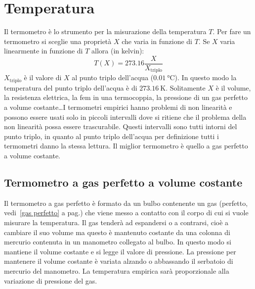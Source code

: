 \section{Temperatura}
Il termometro è lo strumento per la misurazione della temperatura $T$. Per fare un termometro si sceglie una proprietà $X$ che varia in funzione di $T$. Se $X$ varia linearmente in funzione di $T$ allora (in kelvin):
\begin{equation}
   T(X)=273.16\frac{X}{X_\text{triplo}}
\end{equation}
$X_\text{triplo}$ è il valore di $X$ al punto triplo dell'acqua ($\SI{0.01}{\celsius}$). In questo modo la temperatura del punto triplo dell'acqua è di $\SI{273.16}{\kelvin}$. Solitamente $X$ è il volume, la resistenza elettrica, la fem in una termocoppia, la pressione di un gas perfetto a volume costante\ldots I termometri empirici hanno problemi di non linearità e possono essere usati solo in piccoli intervalli dove si ritiene che il problema della non linearità possa essere trascurabile. Questi intervalli sono tutti intorni del punto triplo, in quanto al punto triplo dell'acqua per definizione tutti i termometri danno la stessa lettura. Il miglior termometro è quello a gas perfetto a volume costante.

\subsection{Termometro a gas perfetto a volume costante}
Il termometro a gas perfetto è formato da un bulbo contenente un gas (perfetto, vedi~\ref{gas perfetto} a pag.\@ \pageref{gas perfetto}) che viene messo a contatto con il corpo di cui si vuole misurare la temperatura. Il gas tenderà ad espandersi o a contrarsi, cioè a cambiare il suo volume ma questo è mantenuto costante da una colonna di mercurio contenuta in un manometro collegato al bulbo. In questo modo si mantiene il volume costante e si legge il valore di pressione. La pressione per mantenere il volume costante è variata alzando o abbassando il serbatoio di mercurio del manometro. La temperatura empirica sarà proporzionale alla variazione di pressione del gas.

